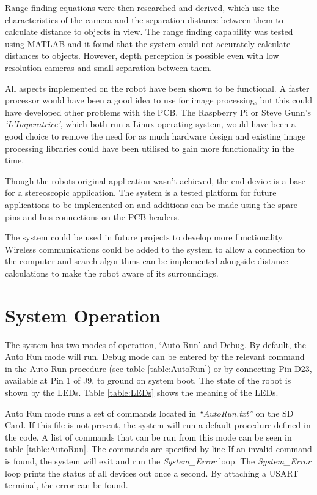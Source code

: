 Range finding equations were then researched and derived, which use the characteristics of the camera and the separation distance between them to calculate distance to objects in view. The range finding capability was tested using MATLAB and it found that the system could not accurately calculate distances to objects. However, depth perception is possible even with low resolution cameras and small separation between them.

All aspects implemented on the robot have been shown to be functional. A faster processor would have been a good idea to use for image processing, but this could have developed other problems with the PCB. The Raspberry Pi or Steve Gunn's \textit{`L'Imperatrice'}, which both run a Linux operating system, would have been a good choice to remove the need for as much hardware design and existing image processing libraries could have been utilised to gain more functionality in the time. 

Though the robots original application wasn't achieved, the end device is a base for a stereoscopic application. The system is a tested platform for future applications to be implemented on and additions can be made using the spare pins and bus connections on the PCB headers. 

The system could be used in future projects to develop more functionality. Wireless communications could be added to the system to allow a connection to the computer and search algorithms can be implemented alongside distance calculations to make the robot aware of its surroundings. 

\section{System Operation}
The system has two modes of operation, `Auto Run' and Debug. By default, the Auto Run mode will run. Debug mode can be entered by the relevant command in the Auto Run procedure (see table \ref{table:AutoRun}) or by connecting Pin D23, available at Pin 1 of J9, to ground on system boot. The state of the robot is shown by the LEDs. Table \ref{table:LEDs} shows the meaning of the LEDs.

Auto Run mode runs a set of commands located in \textit{``AutoRun.txt''} on the SD Card. If this file is not present, the system will run a default procedure defined in the code. A list of commands that can be run from this mode can be seen in table \ref{table:AutoRun}. The commands are specified by line If an invalid command is found, the system will exit and run the \textit{System\_Error} loop. The  \textit{System\_Error} loop prints the status of all devices out once a second. By attaching a USART terminal, the error can be found.

